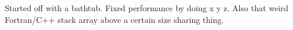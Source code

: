 Started off with a bathtub. Fixed performance by doing x y z. Also that weird
Fortran/C++ stack array above a certain size sharing thing.
